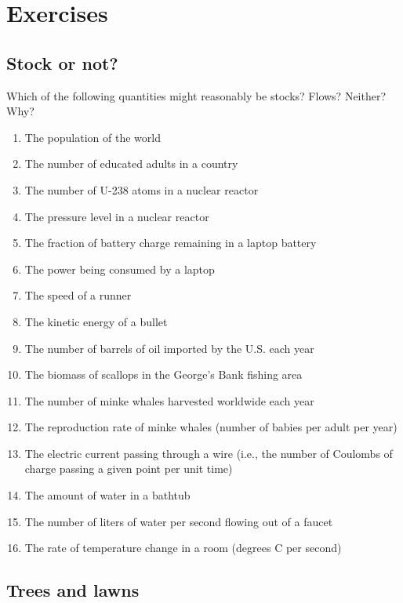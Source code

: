 \pagebreak

\section{Exercises}

\subsection{Stock or not?}

Which of the following quantities might reasonably be stocks?  Flows?  Neither? Why?

\begin{enumerate}
\item The population of the world
\item The number of educated adults in a country
\item The number of U-238 atoms in a nuclear reactor
\item The pressure level in a nuclear reactor
\item The fraction of battery charge remaining in a laptop battery
\item The power being consumed by a laptop
\item The speed of a runner
\item The kinetic energy of a bullet
\item The number of barrels of oil imported by the U.S. each year
\item The biomass of scallops in the George's Bank fishing area
\item The number of minke whales harvested worldwide each year
\item The reproduction rate of minke whales (number of babies per adult per year)
\item The electric current passing through a wire (i.e., the number of Coulombs of charge passing a given point per unit time)
\item The amount of water in a bathtub
\item The number of liters of water per second flowing out of a faucet
\item The rate of temperature change in a room (degrees C per second)
 \end{enumerate}
 
\subsection{Trees and lawns}

